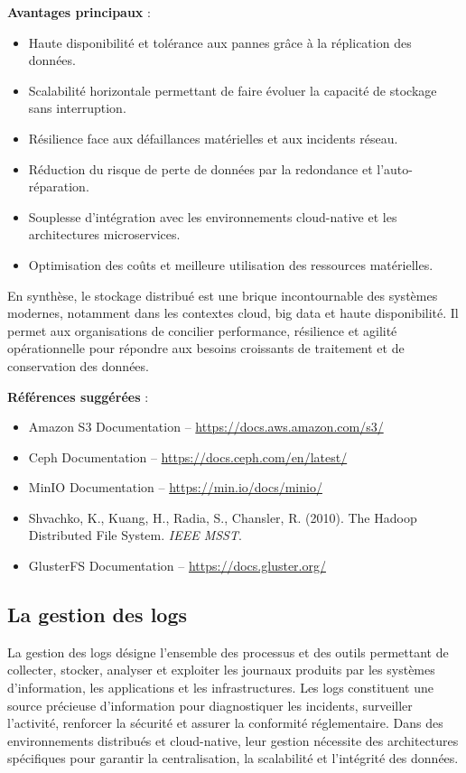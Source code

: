 \textbf{Avantages principaux} :
\begin{itemize}
	\item Haute disponibilité et tolérance aux pannes grâce à la réplication des données.
	\item Scalabilité horizontale permettant de faire évoluer la capacité de stockage sans interruption.
	\item Résilience face aux défaillances matérielles et aux incidents réseau.
	\item Réduction du risque de perte de données par la redondance et l’auto-réparation.
	\item Souplesse d’intégration avec les environnements cloud-native et les architectures microservices.
	\item Optimisation des coûts et meilleure utilisation des ressources matérielles.
\end{itemize}

En synthèse, le stockage distribué est une brique incontournable des systèmes modernes, notamment dans les contextes cloud, big data et haute disponibilité. Il permet aux organisations de concilier performance, résilience et agilité opérationnelle pour répondre aux besoins croissants de traitement et de conservation des données.

\textbf{Références suggérées} :
\begin{itemize}
	\item Amazon S3 Documentation – \url{https://docs.aws.amazon.com/s3/}
	\item Ceph Documentation – \url{https://docs.ceph.com/en/latest/}
	\item MinIO Documentation – \url{https://min.io/docs/minio/}
	\item Shvachko, K., Kuang, H., Radia, S., Chansler, R. (2010). The Hadoop Distributed File System. \textit{IEEE MSST}.
	\item GlusterFS Documentation – \url{https://docs.gluster.org/}
\end{itemize}

\subsection{La gestion des logs}

La gestion des logs désigne l’ensemble des processus et des outils permettant de collecter, stocker, analyser et exploiter les journaux produits par les systèmes d’information, les applications et les infrastructures. Les logs constituent une source précieuse d’information pour diagnostiquer les incidents, surveiller l’activité, renforcer la sécurité et assurer la conformité réglementaire. Dans des environnements distribués et cloud-native, leur gestion nécessite des architectures spécifiques pour garantir la centralisation, la scalabilité et l’intégrité des données.

